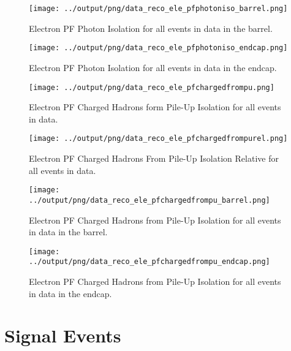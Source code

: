 \documentclass[11pt]{book}
\begin{document}
\begin{figure}[htb]
\centering
\texttt{[image: ../output/png/data\_reco\_ele\_pfphotoniso\_barrel.png]}
\caption{Electron PF Photon Isolation for all events in data in the barrel.}
\label{fig:data_ele_pfphotoniso_barrel}
\end{figure}

\begin{figure}[htb]
\centering
\texttt{[image: ../output/png/data\_reco\_ele\_pfphotoniso\_endcap.png]}
\caption{Electron PF Photon Isolation for all events in data in the endcap.}
\label{fig:data_ele_pfphotoniso_endcap}
\end{figure}

\begin{figure}[htb]
\centering
\texttt{[image: ../output/png/data\_reco\_ele\_pfchargedfrompu.png]}
\caption{Electron PF Charged Hadrons form Pile-Up Isolation for all events in data.}
\label{fig:data_ele_pfchargedfrompu}
\end{figure}

\begin{figure}[htb]
\centering
\texttt{[image: ../output/png/data\_reco\_ele\_pfchargedfrompurel.png]}
\caption{Electron PF Charged Hadrons From Pile-Up Isolation Relative for all events in data.}
\label{fig:data_ele_pfchargedfrompurel}
\end{figure}

\begin{figure}[htb]
\centering
\texttt{[image: ../output/png/data\_reco\_ele\_pfchargedfrompu\_barrel.png]}
\caption{Electron PF Charged Hadrons from Pile-Up Isolation for all events in data in the barrel.}
\label{fig:data_ele_pfchargedfrompu_barrel}
\end{figure}

\begin{figure}[htb]
\centering
\texttt{[image: ../output/png/data\_reco\_ele\_pfchargedfrompu\_endcap.png]}
\caption{Electron PF Charged Hadrons from Pile-Up Isolation for all events in data in the endcap.}
\label{fig:data_ele_pfchargedfrompu_endcap}
\end{figure}

\clearpage




\section{Signal Events}
\end{document}
